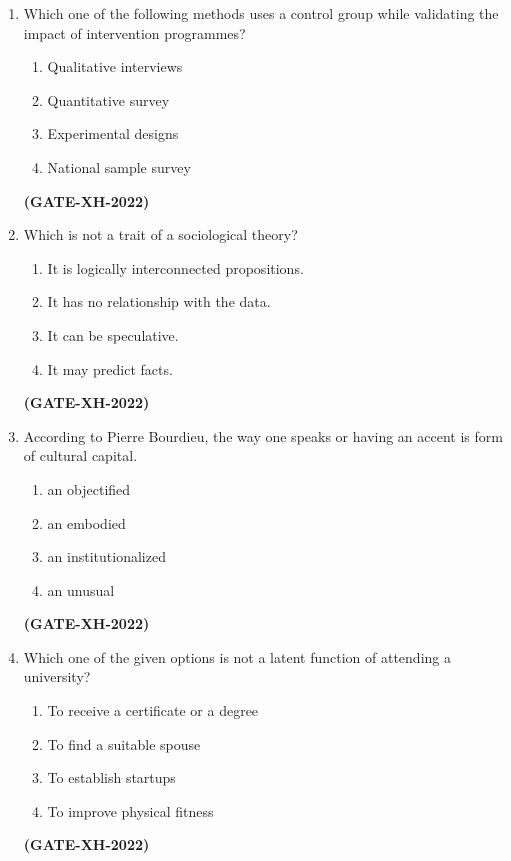 \documentclass[journal]{IEEEtran}
\begin{document}
\begin{enumerate}
\item
Which one of the following methods uses a control group while validating the impact of intervention programmes?
\begin{multicols}{2}
\begin{enumerate}
\item Qualitative interviews
\item Quantitative survey
\item Experimental designs
\item National sample survey
\end{enumerate}
\end{multicols}
\hfill\textbf{(GATE-XH-2022)}

\item
Which is not a trait of a sociological theory?
\begin{enumerate}
\item It is logically interconnected propositions.
\item It has no relationship with the data.
\item It can be speculative.
\item It may predict facts.
\end{enumerate}
\hfill\textbf{(GATE-XH-2022)}

\item
According to Pierre Bourdieu, the way one speaks or having an accent is \underline{\hspace{1cm}} form of cultural capital.
\begin{multicols}{2}
\begin{enumerate}
\item an objectified
\item an embodied
\item an institutionalized
\item an unusual
\end{enumerate}
\end{multicols}
\hfill\textbf{(GATE-XH-2022)}

\item
Which one of the given options is not a latent function of attending a university?
\begin{multicols}{2}
\begin{enumerate}
\item To receive a certificate or a degree
\item To find a suitable spouse
\item To establish startups
\item To improve physical fitness
\end{enumerate}
\end{multicols}
\hfill\textbf{(GATE-XH-2022)}


\end{enumerate}
\end{document}
